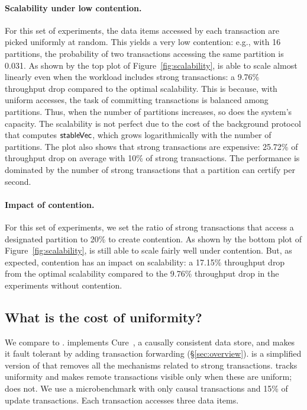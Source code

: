 \paragraph{Scalability under low contention.}
For this set of experiments, the data items accessed by each
transaction are picked uniformly at random. This yields a very low contention: e.g., with 16 partitions, the
probability of two transactions accessing the same partition is
0.031. As shown by the top plot of Figure~\ref{fig:scalability}, \System is able to scale almost linearly even when the
workload includes strong transactions: a 9.76\% throughput drop compared
to the optimal scalability.  This is because, with uniform accesses, the task of committing
transactions is balanced among partitions. Thus, when the number of
partitions increases, so does the system's capacity. The
scalability is not perfect due to the cost of the background
protocol that computes ${\sf stableVec}$, which grows logarithmically with the
number of partitions.
The plot also shows that strong transactions are expensive: 25.72\% of
throughput drop on average with 10\% of strong 
transactions. The performance is dominated by the
number of strong transactions that a partition can certify per
second. 





\paragraph{Impact of contention.}
For this set of experiments, we set the ratio of strong transactions that access
a designated partition to 20\% to create contention. 
As shown by the bottom plot of Figure~\ref{fig:scalability}, \System is still able to
scale fairly well under contention. But, as expected,
contention has an impact on scalability: a 17.15\% throughput drop
from the optimal scalability compared to the 9.76\% throughput drop in
the experiments without contention.






\subsection{What is the cost of uniformity?}
\label{sec:cost-uniformity}
We compare \CureFT to \Uniform. 
\CureFT implements Cure~\cite{cure}, a causally consistent data store,
and makes it fault tolerant by adding transaction forwarding (\S\ref{sec:overview}).
\Uniform is a simplified version
of \System that removes
all the mechanisms related to strong transactions. \Uniform tracks uniformity and makes remote transactions visible only
when these are uniform; \CureFT does not. We use a microbenchmark with only causal
transactions and 15\% of update transactions. Each transaction
accesses three data items. 


